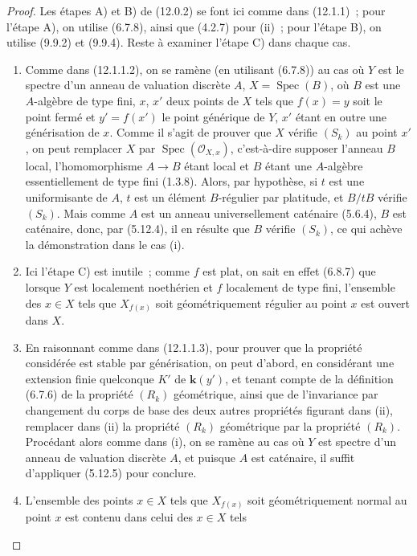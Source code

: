 \begin{proof}
Les étapes A) et B) de (12.0.2) se font ici comme dans (12.1.1)~; pour l'étape
A), on utilise (6.7.8), ainsi que (4.2.7) pour (ii)~; pour l'étape B), on
utilise (9.9.2) et (9.9.4). Reste à examiner l'étape C) dans chaque cas.
\begin{enumerate}[label=(\roman*)]
  \item[(i)] Comme dans (12.1.1.2), on se ramène (en utilisant (6.7.8)) au cas
  où $Y$ est le spectre d'un anneau de valuation discrète $A$,
  $X=\operatorname{Spec}(B)$, où $B$ est une $A$-algèbre de type fini, $x$,
  $x'$ deux points de $X$ tels que $f(x)=y$ soit le point fermé et
  $y'=f(x')$ le point générique de $Y$, $x'$ étant en outre une générisation
  de $x$. Comme il s'agit de prouver que $X$ vérifie $(S_k)$ au point $x'$,
  on peut remplacer $X$ par $\operatorname{Spec}(\mathcal O_{X,x})$,
  c'est-à-dire supposer l'anneau $B$ local, l'homomorphisme $A\to B$ étant
  local et $B$ étant une $A$-algèbre essentiellement de type fini (1.3.8).
  Alors, par hypothèse, si $t$ est une uniformisante de $A$, $t$ est un
  élément $B$-régulier par platitude, et $B/tB$ vérifie $(S_k)$. Mais comme
  $A$ est un anneau universellement caténaire (5.6.4), $B$ est caténaire,
  donc, par (5.12.4), il en résulte que $B$ vérifie $(S_k)$, ce qui achève la
  démonstration dans le cas (i).
  \item[(iii)] Ici l'étape C) est inutile~; comme $f$ est plat, on sait en
  effet (6.8.7) que lorsque $Y$ est localement noethérien et $f$ localement de
  type fini, l'ensemble des $x\in X$ tels que $X_{f(x)}$ soit géométriquement
  régulier au point $x$ est ouvert dans $X$.
  \item[(ii)] En raisonnant comme dans (12.1.1.3), pour prouver que la propriété
  considérée est stable par générisation, on peut d'abord, en considérant une
  extension finie quelconque $K'$ de $\boldsymbol{k}(y')$, et tenant compte de la définition
  (6.7.6) de la propriété $(R_k)$ géométrique, ainsi que de l'invariance par
  changement du corps de base des deux autres propriétés figurant dans (ii),
  remplacer dans (ii) la propriété $(R_k)$ géométrique par la propriété
  $(R_k)$. Procédant alors comme dans (i), on se ramène au cas où $Y$ est
  spectre d'un anneau de valuation discrète $A$, et puisque $A$ est caténaire,
  il suffit d'appliquer (5.12.5) pour conclure.
  \item[(iv)] L'ensemble des points $x\in X$ tels que $X_{f(x)}$ soit
  géométriquement normal au point $x$ est contenu dans celui des $x\in X$ tels

\end{enumerate}
\end{proof}

